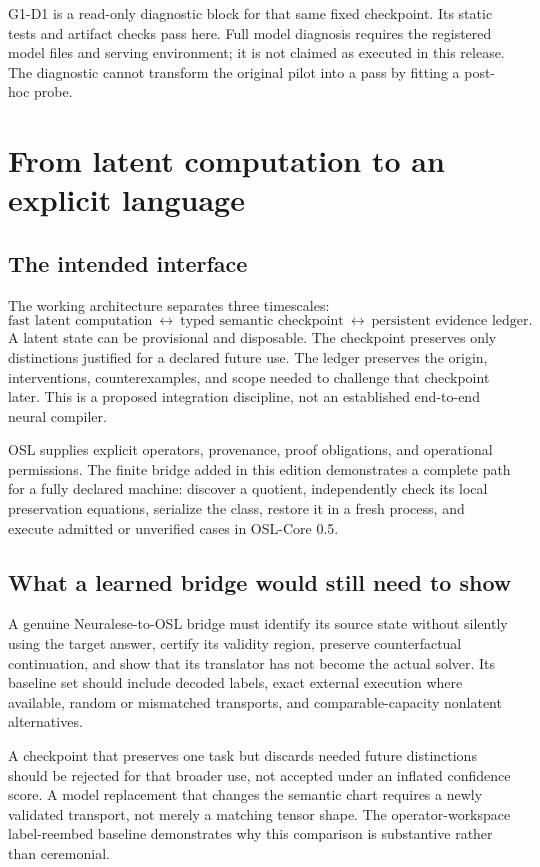 \documentclass[11pt]{article}
\begin{document}
G1-D1 is a read-only diagnostic block for that same fixed checkpoint. Its static tests and artifact checks pass here. Full model diagnosis requires the registered model files and serving environment; it is not claimed as executed in this release. The diagnostic cannot transform the original pilot into a pass by fitting a post-hoc probe.

\section{From latent computation to an explicit language}
\subsection{The intended interface}
The working architecture separates three timescales:
\[
\text{fast latent computation}\ \leftrightarrow\ \text{typed semantic checkpoint}\ \leftrightarrow\ \text{persistent evidence ledger}.
\]
A latent state can be provisional and disposable. The checkpoint preserves only distinctions justified for a declared future use. The ledger preserves the origin, interventions, counterexamples, and scope needed to challenge that checkpoint later. This is a proposed integration discipline, not an established end-to-end neural compiler.

OSL supplies explicit operators, provenance, proof obligations, and operational permissions. The finite bridge added in this edition demonstrates a complete path for a fully declared machine: discover a quotient, independently check its local preservation equations, serialize the class, restore it in a fresh process, and execute admitted or unverified cases in OSL-Core 0.5. \cite{oslfi}

\subsection{What a learned bridge would still need to show}
A genuine Neuralese-to-OSL bridge must identify its source state without silently using the target answer, certify its validity region, preserve counterfactual continuation, and show that its translator has not become the actual solver. Its baseline set should include decoded labels, exact external execution where available, random or mismatched transports, and comparable-capacity nonlatent alternatives.

A checkpoint that preserves one task but discards needed future distinctions should be rejected for that broader use, not accepted under an inflated confidence score. A model replacement that changes the semantic chart requires a newly validated transport, not merely a matching tensor shape. The operator-workspace label-reembed baseline demonstrates why this comparison is substantive rather than ceremonial.
\end{document}
